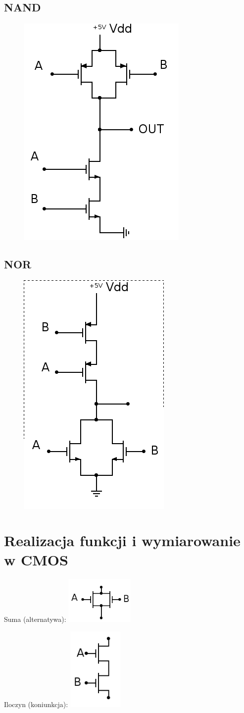 \documentclass[10pt,a4paper]{article}
\begin{document}
\subsection{NAND}
\begin{figure}[H]
\centering
\includegraphics[height=0.35\textwidth]{NAND.png}
\end{figure}

\subsection{NOR}
\begin{figure}[H]
\centering
\includegraphics[height=0.35\textwidth]{NOR.png}
\end{figure}

\section{Realizacja funkcji i wymiarowanie w CMOS}
Suma (alternatywa):
\includegraphics[width=0.25\textwidth]{suma.png}

Iloczyn (koniunkcja):
\includegraphics[width=0.2\textwidth]{iloczyn.png}
\end{document}
